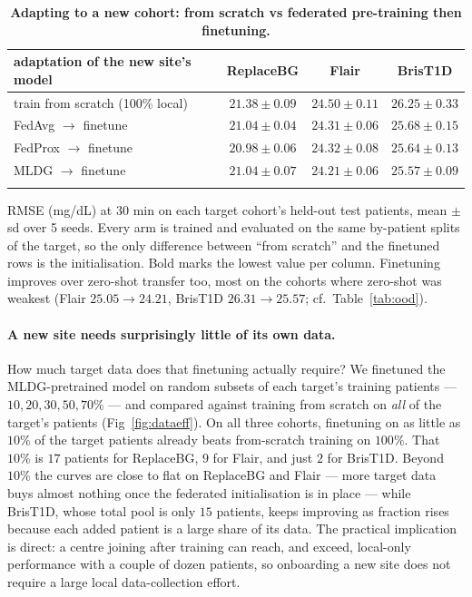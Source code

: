 \documentclass[10pt,letterpaper]{article}
\newlength\savedwidth
\newcommand\thickhline{\noalign{\global\savedwidth\arrayrulewidth\global\arrayrulewidth 2pt}%
\hline
\noalign{\global\arrayrulewidth\savedwidth}}
\begin{document}
\begin{table}[!ht]
\centering
\captionsetup{justification=centering,singlelinecheck=on}
\caption{\bf Adapting to a new cohort: from scratch vs federated pre-training then finetuning.}
\label{tab:finetune}
\begin{tabular}{lccc}
\thickhline
adaptation of the new site's model & ReplaceBG & Flair & BrisT1D \\
\hline
train from scratch (100\% local) & $21.38 \pm 0.09$ & $24.50 \pm 0.11$ & $26.25 \pm 0.33$ \\
\hline
FedAvg $\rightarrow$ finetune  & $21.04 \pm 0.04$ & $24.31 \pm 0.06$ & $25.68 \pm 0.15$ \\
FedProx $\rightarrow$ finetune & $\mathbf{20.98 \pm 0.06}$ & $24.32 \pm 0.08$ & $25.64 \pm 0.13$ \\
MLDG $\rightarrow$ finetune    & $21.04 \pm 0.07$ & $\mathbf{24.21 \pm 0.06}$ & $\mathbf{25.57 \pm 0.09}$ \\
\thickhline
\end{tabular}
\begin{center}
{\small RMSE (mg/dL) at 30 min on each target cohort's held-out test patients,
mean $\pm$ sd over 5 seeds. Every arm is trained and evaluated on the same
by-patient splits of the target, so the only difference between ``from scratch''
and the finetuned rows is the initialisation. Bold marks the lowest value per
column. Finetuning improves over zero-shot transfer too, most on the cohorts where
zero-shot was weakest (Flair $25.05\rightarrow24.21$, BrisT1D
$26.31\rightarrow25.57$; cf.\ Table~\ref{tab:ood}).}
\end{center}
\end{table}

\paragraph{A new site needs surprisingly little of its own data.} How much
target data does that finetuning actually require? We finetuned the
MLDG-pretrained model on random subsets of each target's training patients ---
$10, 20, 30, 50, 70\%$ --- and compared against training from scratch on
\emph{all} of the target's patients (Fig~\ref{fig:dataeff}). On all three cohorts,
finetuning on as little as $10\%$ of the target patients already beats
from-scratch training on $100\%$. That $10\%$ is $17$ patients for ReplaceBG,
$9$ for Flair, and just $2$ for BrisT1D.
Beyond $10\%$ the curves are close to flat on ReplaceBG and Flair --- more target
data buys almost nothing once the federated initialisation is in place --- while
BrisT1D, whose total pool is only $15$ patients, keeps improving as fraction rises
because each added patient is a large share of its data. The practical implication
is direct: a centre joining after training can reach, and exceed, local-only
performance with a couple of dozen patients, so onboarding a new site does not
require a large local data-collection effort.
\end{document}
